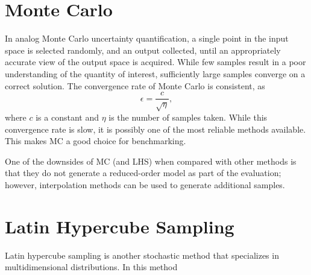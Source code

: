 \section{Monte Carlo}
In analog Monte Carlo uncertainty quantification, a single point in the input space is selected randomly,
and an output collected, until an appropriately accurate view of the output space is acquired.  While few
samples result in a poor understanding of the quantity of interest, sufficiently large samples converge on a
correct solution.  The convergence rate of Monte Carlo is consistent, as
\begin{equation}
  \epsilon = \frac{c}{\sqrt{\eta}},
\end{equation}
where $c$ is a constant and $\eta$ is the number of samples taken.  While this convergence rate is slow, it is possibly one of the
most reliable methods available.  This makes MC a good choice for benchmarking.

One of the downsides of MC (and LHS) when compared with other methods is that they do not generate a
reduced-order model as part of the evaluation; however, interpolation methods can be used to generate
additional samples.

\section{Latin Hypercube Sampling}
Latin hypercube sampling\cite{lhs} is another stochastic method that specializes in multidimensional
distributions.  In this method
